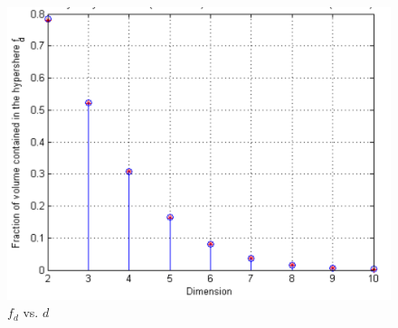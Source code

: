 \documentclass[submit]{harvardml}
\begin{document}
\begin{figure}[h]
    \centering
    \includegraphics[scale=0.5]{prob1}
    \caption{$f_d$ vs. $d$}
    \label{fig:my_label}
\end{figure}
\end{document}
